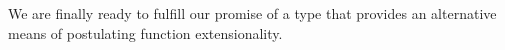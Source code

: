 \ccpad
We are finally ready to fulfill our promise of a type that provides an alternative means of postulating function extensionality.
\ccpad
\begin{code}%
\>[1]\AgdaSpace{}%
\AgdaSymbol{:}\AgdaSpace{}%
\AgdaSymbol{(}\AgdaSpace{}%
\AgdaSpace{}%
\AgdaSymbol{:}\AgdaSpace{}%
\AgdaSymbol{)}\AgdaSpace{}%
\AgdaSpace{}%
\AgdaSymbol{(}\AgdaSpace{}%
\AgdaSpace{}%
\AgdaSymbol{)}\AgdaSpace{}%
\<%
\\
%
\>[1]\AgdaSpace{}%
\AgdaSpace{}%
\AgdaSpace{}%
\AgdaSymbol{=}\AgdaSpace{}%
\AgdaSymbol{\{}\AgdaSpace{}%
\AgdaSymbol{:}\AgdaSpace{}%
\AgdaSpace{}%
\AgdaSymbol{\}\{}\AgdaSpace{}%
\AgdaSymbol{:}\AgdaSpace{}%
\AgdaSpace{}%
\AgdaSpace{}%
\AgdaSpace{}%
\AgdaSymbol{\}}\AgdaSpace{}%
\AgdaSymbol{(}\AgdaSpace{}%
\AgdaSpace{}%
\AgdaSymbol{:}\AgdaSpace{}%
\AgdaSpace{}%
\AgdaSymbol{)}\AgdaSpace{}%
\AgdaSpace{}%
\AgdaSpace{}%
\AgdaSymbol{(}\AgdaSpace{}%
\AgdaSpace{}%
\AgdaSymbol{)}\<%
\end{code}

